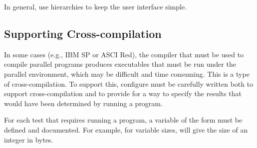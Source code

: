 \documentclass{article}
\begin{document}
In general, use hierarchies to keep the user interface simple.

\subsection{Supporting Cross-compilation}
\label{sec:cross-compile}
In some cases (e.g., IBM SP or ASCI Red), the compiler that must be used to
compile parallel programs produces executables that must be run under
the parallel environment, which may be difficult and time consuming.
This is a type of cross-compilation.  To support this, configure must
be carefully written both to support cross-compilation and to provide
for a way to specify the results that would have been determined by
running a program.

For each test that requires running a program, a variable of the form
 must be defined and documented.  For example, for
variable sizes,  will give the size of an
integer in bytes.
\end{document}

